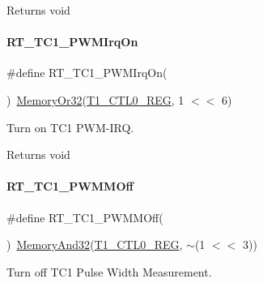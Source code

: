 \begin{DoxyReturn}{Returns}
void 
\end{DoxyReturn}
\mbox{\label{a00044_a61477182241a8629176801cca44ce09a}} 
\paragraph{\texorpdfstring{R\+T\+\_\+\+T\+C1\+\_\+\+P\+W\+M\+Irq\+On}{RT\_TC1\_PWMIrqOn}}
{\footnotesize\ttfamily \#define R\+T\+\_\+\+T\+C1\+\_\+\+P\+W\+M\+Irq\+On(\begin{DoxyParamCaption}{ }\end{DoxyParamCaption})~\mbox{\hyperlink{a00020_a27874a97deab7cecdde5ddecf466e31e}{Memory\+Or32}}(\mbox{\hyperlink{a00020_adadaa0ab1ebbd7ba9b70dfd24c3ed44da38632250c2e72df96fcaa3f8bd8ecc5e}{T1\+\_\+\+C\+T\+L0\+\_\+\+R\+EG}}, 1 $<$$<$ 6)}



Turn on T\+C1 P\+W\+M-\/\+I\+RQ. 

\begin{DoxyReturn}{Returns}
void 
\end{DoxyReturn}
\mbox{\label{a00044_aa070a043272a38ae84492146683a00d3}} 
\paragraph{\texorpdfstring{R\+T\+\_\+\+T\+C1\+\_\+\+P\+W\+M\+M\+Off}{RT\_TC1\_PWMMOff}}
{\footnotesize\ttfamily \#define R\+T\+\_\+\+T\+C1\+\_\+\+P\+W\+M\+M\+Off(\begin{DoxyParamCaption}{ }\end{DoxyParamCaption})~\mbox{\hyperlink{a00020_ad87cedffcaadc51db22594fce55173d4}{Memory\+And32}}(\mbox{\hyperlink{a00020_adadaa0ab1ebbd7ba9b70dfd24c3ed44da38632250c2e72df96fcaa3f8bd8ecc5e}{T1\+\_\+\+C\+T\+L0\+\_\+\+R\+EG}}, $\sim$(1 $<$$<$ 3))}



Turn off T\+C1 Pulse Width Measurement. 

